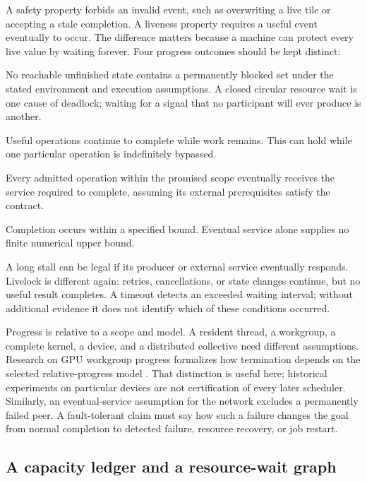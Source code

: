 A safety property forbids an invalid event, such as overwriting a live tile or accepting a stale completion. A liveness property requires a useful event eventually to occur. The difference matters because a machine can protect every live value by waiting forever. Four progress outcomes should be kept distinct:
\begin{description}[style=nextline]
\item[Deadlock freedom] No reachable unfinished state contains a permanently blocked set under the stated environment and execution assumptions. A closed circular resource wait is one cause of deadlock; waiting for a signal that no participant will ever produce is another.
\item[System-wide useful progress] Useful operations continue to complete while work remains. This can hold while one particular operation is indefinitely bypassed.
\item[Starvation freedom] Every admitted operation within the promised scope eventually receives the service required to complete, assuming its external prerequisites satisfy the contract.
\item[Bounded completion latency] Completion occurs within a specified bound. Eventual service alone supplies no finite numerical upper bound.
\end{description}
A long stall can be legal if its producer or external service eventually responds. Livelock is different again: retries, cancellations, or state changes continue, but no useful result completes. A timeout detects an exceeded waiting interval; without additional evidence it does not identify which of these conditions occurred.

Progress is relative to a scope and model. A resident thread, a workgroup, a complete kernel, a device, and a distributed collective need different assumptions. Research on GPU workgroup progress formalizes how termination depends on the selected relative-progress model \citep{u008_sorensen}. That distinction is useful here; historical experiments on particular devices are not certification of every later scheduler. Similarly, an eventual-service assumption for the network excludes a permanently failed peer. A fault-tolerant claim must say how such a failure changes the goal from normal completion to detected failure, resource recovery, or job restart.

\subsection{A capacity ledger and a resource-wait graph}

